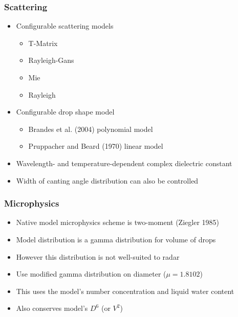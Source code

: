 \documentclass[red]{beamer}
\begin{document}
\begin{frame}
	\frametitle{Scattering}
	\begin{itemize}
		\item Configurable scattering models
		\begin{itemize}
			\item T-Matrix
			\item Rayleigh-Gans
			\item Mie
			\item Rayleigh
			\end{itemize}
		\item Configurable drop shape model
		\begin{itemize}
			\item Brandes et al. (2004) polynomial model
			\item Pruppacher and Beard (1970) linear model
			\end{itemize}
		\item Wavelength- and temperature-dependent complex dielectric constant
		\item Width of canting angle distribution can also be controlled
	\end{itemize}
\end{frame}

\begin{frame}
	\frametitle{Microphysics}
	\begin{itemize}
		\item Native model microphysics scheme is two-moment (Ziegler 1985)
		\item Model distribution is a gamma distribution for volume of drops
		\item However this distribution is not well-suited to radar
		\item Use modified gamma distribution on diameter ($\mu=1.8102$)
		\item This uses the model's number concentration and liquid water content
		\item Also conserves model's $D^6$ (or $V^2$)
	\end{itemize}
\end{frame}
\end{document}
